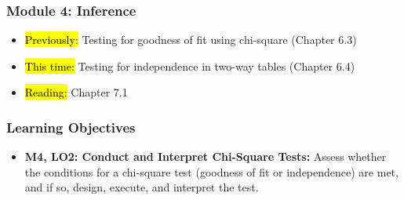 
\begin{frame}
    \frametitle{Module 4: Inference}
    \begin{itemize}
        \item \hl{Previously: }Testing for goodness of fit using chi-square (Chapter 6.3)
        \item \hl{This time: }Testing for independence in two-way tables (Chapter 6.4)
        \item \hl{Reading: }Chapter 7.1
    \end{itemize}

\end{frame}
\begin{frame}
    \frametitle{Learning Objectives}
    \begin{itemize}
        \item \textbf{M4, LO2: Conduct and Interpret Chi-Square Tests:} Assess whether the conditions for a chi-square test (goodness of fit or independence) are met, and if so, design, execute, and interpret the test.
    \end{itemize}
\end{frame}
